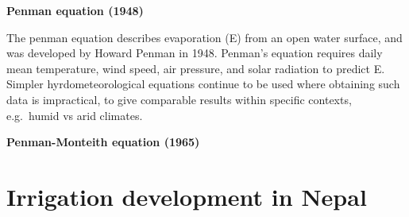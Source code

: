 \documentclass[
  openany]{book}
\begin{document}
\textbf{Penman equation (1948)}

The penman equation describes evaporation (E) from an open water surface, and was developed by Howard Penman in 1948. Penman's equation requires daily mean temperature, wind speed, air pressure, and solar radiation to predict E. Simpler hyrdometeorological equations continue to be used where obtaining such data is impractical, to give comparable results within specific contexts, e.g.~humid vs arid climates.

\textbf{Penman-Monteith equation (1965)}

\hypertarget{irrigation-development-in-nepal}{%
\section{Irrigation development in Nepal}\label{irrigation-development-in-nepal}}
\end{document}
